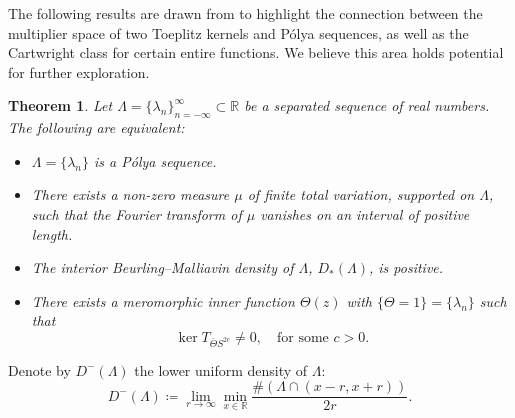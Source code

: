 \documentclass[12pt,a4paper]{amsart}
\newtheorem{theorem}{Theorem}[section]
\begin{document}
The following results are drawn from \cite{Mitkovski2010,Mitkovski2011,natalia2016} to highlight the connection between the multiplier space of two Toeplitz kernels and P\'olya sequences, as well as the Cartwright class for certain entire functions. We believe this area holds potential for further exploration.

\begin{theorem}\cite{Mitkovski2010} \label{thmA}
	Let $\Lambda = \{\lambda_n\}_{n=-\infty}^{\infty} \subset \mathbb{R}$ be a separated sequence of real numbers. The following are equivalent:
	
	\begin{itemize}
		\item[(i)] $\Lambda = \{\lambda_n\}$ is a Pólya sequence.
		\item[(ii)] There exists a non-zero measure $\mu$ of finite total variation, supported on $\Lambda$, such that the Fourier transform of $\mu$ vanishes on an interval of positive length.
		\item[(iii)] The interior Beurling--Malliavin density of $\Lambda$, $D_{*}(\Lambda)$, is positive.
		\item[(iv)] There exists a meromorphic inner function $\Theta(z)$ with $\{\Theta = 1\} = \{\lambda_n\}$ such that
		\[
		 \ker T_{\overline{\Theta} S^{2c}} \neq 0, \quad \text{for some } c > 0.
		\]
	\end{itemize}
\end{theorem}

Denote by $D^-(\Lambda)$ the lower uniform density of $\Lambda$:
\[D^-(\Lambda) \coloneqq \lim_{r \to \infty }\min_{x\in \mathbb R}\frac{\#(\Lambda\cap(x-r,x+r))}{2r}.\]
\end{document}

